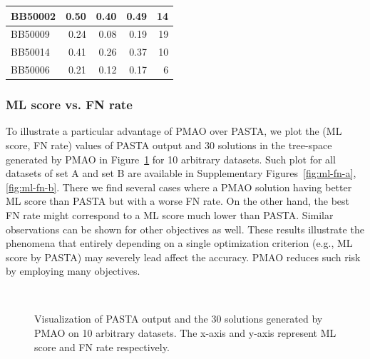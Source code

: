 \begin{table}[!htbp]
\begin{tabular}{|l|r|r|r||r|}
		\hline
		BB50002 & \cellcolor[rgb]{ .988,  1,  .992}0.50 & \cellcolor[rgb]{ .384,  .745,  .478}0.40 & \cellcolor[rgb]{ .941,  .98,  .953}0.49 & \cellcolor[rgb]{ .984,  .733,  .741}14 \\
		\hline
		BB50009 & \cellcolor[rgb]{ .988,  1,  .992}0.24 & \cellcolor[rgb]{ .384,  .745,  .478}0.08 & \cellcolor[rgb]{ .788,  .914,  .82}0.19 & \cellcolor[rgb]{ .98,  .631,  .643}19 \\
		\hline
		BB50014 & \cellcolor[rgb]{ .988,  1,  .992}0.41 & \cellcolor[rgb]{ .384,  .745,  .478}0.26 & \cellcolor[rgb]{ .835,  .933,  .863}0.37 & \cellcolor[rgb]{ .984,  .812,  .824}10 \\
		\hline
		BB50006 & \cellcolor[rgb]{ .988,  1,  .992}0.21 & \cellcolor[rgb]{ .384,  .745,  .478}0.12 & \cellcolor[rgb]{ .725,  .886,  .769}0.17 & \cellcolor[rgb]{ .988,  .89,  .902}6 \\
		\hline
	\end{tabular}%
	\label{tab:pmao-pasta-b}%
\end{table}%

\subsubsection{ML score vs. FN rate}
To illustrate a particular advantage of PMAO over PASTA, we plot the (ML score, FN rate) values of PASTA output and 30 solutions in the tree-space generated by PMAO in Figure~\ref{fig:ml-fn} for 10 arbitrary datasets. Such plot for all datasets of set A and set B are available in Supplementary Figures~\ref{fig:ml-fn-a}, \ref{fig:ml-fn-b}. There we find several cases where a PMAO solution having better ML score than PASTA but with a worse FN rate.  On the other hand, the best FN rate might correspond to a ML score much lower than PASTA. Similar observations can be shown for other objectives as well. These results illustrate the phenomena that entirely depending on a single optimization criterion (e.g., ML score by PASTA) may severely lead affect the accuracy. PMAO reduces such risk by employing many objectives.

\begin{figure}[!htbp]%
	\begin{adjustwidth}{-1cm}{}
		\centering
		\\%
	\end{adjustwidth}
	\caption{Visualization of PASTA output and the 30 solutions generated by PMAO on 10 arbitrary datasets. The x-axis and y-axis represent ML score and FN rate respectively.}
	\label{fig:ml-fn}
\end{figure}

